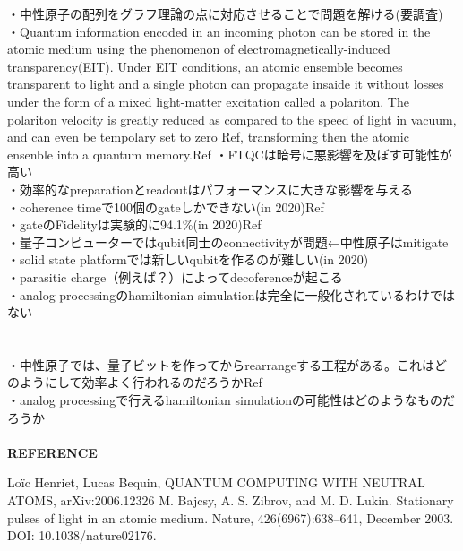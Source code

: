 \documentclass[a4paper,10.5pt]{ltjsarticle}
\begin{document}
・中性原子の配列をグラフ理論の点に対応させることで問題を解ける(要調査)\\
・Quantum information encoded in an incoming photon can be stored in the atomic medium using the phenomenon of electromagnetically-induced transparency(EIT). Under EIT conditions, an atomic ensemble becomes transparent to light and a single photon can propagate insaide it without losses under the form of a mixed light-matter excitation called a polariton. The polariton velocity is greatly reduced as compared to the speed of light in vacuum, and can even be tempolary set to zero Ref\cite{2}, transforming then the atomic ensenble into a quantum memory.Ref\cite{1}
\clearpage
{}
・FTQCは暗号に悪影響を及ぼす可能性が高い\\
・効率的なpreparationとreadoutはパフォーマンスに大きな影響を与える\\
・coherence timeで100個のgateしかできない(in 2020)Ref\cite{1}\\
・gateのFidelityは実験的に94.1\%(in 2020)Ref\cite{1}\\
・量子コンピューターではqubit同士のconnectivityが問題←中性原子はmitigate\\
・solid state platformでは新しいqubitを作るのが難しい(in 2020)\\
・parasitic charge（例えば？）によってdecoferenceが起こる\\
・analog processingのhamiltonian simulationは完全に一般化されているわけではない\\
\\
\\
・中性原子では、量子ビットを作ってからrearrangeする工程がある。これはどのようにして効率よく行われるのだろうかRef\cite{1}\\
・analog processingで行えるhamiltonian simulationの可能性はどのようなものだろうか\\
\\
{\Large \bfseries REFERENCE}
\begin{thebibliography}{1}
\vspace{-1.5cm}
   Loïc Henriet, Lucas Bequin, QUANTUM COMPUTING WITH NEUTRAL ATOMS, arXiv:2006.12326
   M. Bajcsy, A. S. Zibrov, and M. D. Lukin. Stationary pulses of light in an atomic medium. Nature, 426(6967):638–641, December 2003. DOI: 10.1038/nature02176.

\end{thebibliography}
\end{document}
